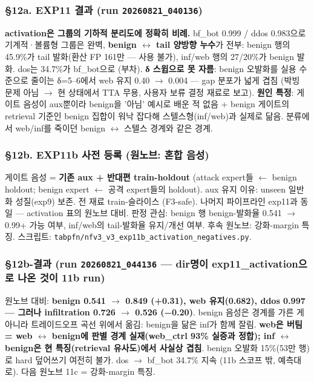 \subsubsection{§12a. EXP11 결과 (run \texttt{20260821\allowbreak{}\_\allowbreak{}\allowbreak{}040136})}
\textbf{activation은 그룹의 기하적 분리도에 정확히 비례.} bf\_\allowbreak{}bot 0.999 /\allowbreak{} ddos 0.983으로 기계적·볼륨형 그룹은 완벽, \textbf{benign \ensuremath{\leftrightarrow} tail 양방향 누수}가 전부: benign 행의 45.9\%가 tail 발화(환산 FP 161만 — 사용 불가), inf/\allowbreak{}web 행의 27/\allowbreak{}20\%가 benign 발화. dos는 34.7\%가 bf\_\allowbreak{}bot으로 (부차). \textbf{δ 스윕으로 못 자름}: benign 오발화를 실용 수준으로 줄이는 δ=\allowbreak{}5–6에서 web 유지 0.40 \ensuremath{\rightarrow} 0.004 — gap 분포가 넓게 겹침 (박빙 문제 아님  \ensuremath{\rightarrow}  현 상태에서 TTA 무용, 사용자 보류 결정 재료로 보고). \textbf{원인 특정}: 게이트 음성이 aux뿐이라 benign을 '아님' 예시로 배운 적 없음 +\allowbreak{} benign 게이트의 retrieval 기준인 benign 집합이 워낙 잡다해 스텔스형(inf/\allowbreak{}web)과 실제로 닮음. 분류에서 web/\allowbreak{}inf를 죽이던 benign \ensuremath{\leftrightarrow} 스텔스 경계와 같은 경계.

\subsubsection{§12b. EXP11b 사전 등록 (원노브: 혼합 음성)}
게이트 음성 =\allowbreak{} \textbf{기존 aux +\allowbreak{} 반대편 train-holdout} (attack expert들 \ensuremath{\leftarrow} benign holdout; benign expert \ensuremath{\leftarrow} 공격 expert들의 holdout). aux 유지 이유: unseen 일반화 성질(exp9) 보존. 전 재료 train-슬라이스 (F3-safe). 나머지 파이프라인 exp11과 동일 — activation 표의 원노브 대비. 판정 관심: benign 행 benign-발화율 0.541 \ensuremath{\rightarrow} 0.99+\allowbreak{} 가능 여부, inf/\allowbreak{}web의 tail-발화율 유지/\allowbreak{}개선 여부. 후속 원노브: 강화-margin 특징. 스크립트: \texttt{tabpfn/\allowbreak{}\allowbreak{}n\allowbreak{}fv3\_\allowbreak{}\allowbreak{}v3\_\allowbreak{}\allowbreak{}e\allowbreak{}xp11b\_\allowbreak{}\allowbreak{}ac\allowbreak{}tivation\allowbreak{}\_\allowbreak{}\allowbreak{}negativ\allowbreak{}es.\allowbreak{}py}.

\subsubsection{§12b-결과 (run \texttt{20260821\allowbreak{}\_\allowbreak{}\allowbreak{}044136} — dir명이 exp11\_\allowbreak{}activation으로 나온 것이 11b run)}
원노브 대비: \textbf{benign 0.541 \ensuremath{\rightarrow} 0.849 (+\allowbreak{}0.31), web 유지(0.682), ddos 0.997 — 그러나 infiltration 0.726 \ensuremath{\rightarrow} 0.526 (−0.20)}. benign 음성은 경계를 가른 게 아니라 트레이드오프 곡선 위에서 옮김: benign을 닮은 inf가 함께 잘림. \textbf{web은 버팀 =\allowbreak{} web \ensuremath{\leftrightarrow} benign에 판별 경계 실재(web\_\allowbreak{}ctrl 93\% 실증과 정합); inf \ensuremath{\leftrightarrow} benign은 현 특징(retrieval 유사도)에서 사실상 겹침}. benign 오발화 15\%(53만 행)로 hard 덮어쓰기 여전히 불가. dos \ensuremath{\rightarrow} bf\_\allowbreak{}bot 34.7\% 지속 (11b 스코프 밖, 예측대로). 다음 원노브 11c =\allowbreak{} 강화-margin 특징.

